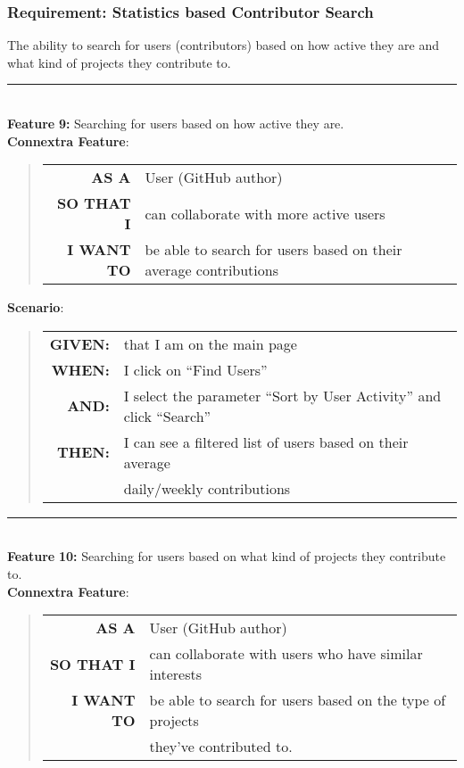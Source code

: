 \documentclass[12pt]{article}
\newcommand{\Feature}[1]{ 
   \noindent \textbf{Feature} #1
}
\newcommand{\GivenSc} {
	\noindent \textbf{GIVEN:}
	}
\newcommand{\WhenSc} {
	\noindent \textbf{WHEN:}
	}
\newcommand{\AndSc} {
	\noindent \textbf{AND:}
	}
\newcommand{\ThenSc} {
	\noindent \textbf{THEN:}
	}
\begin{document}
\pagebreak
\begin{framed}
\subsubsection{Requirement: Statistics based Contributor Search}
The ability to search for users (contributors) based on how active they are and what kind of projects they contribute to.\\[0.2cm]

\hrule~\\

\noindent \Feature{\textbf{9:} Searching for users based on how active they are.}\\[0.2cm]

\noindent \textbf{Connextra Feature}:
\begin{quote}
\begin{tabular}{rl}
\textbf{AS A}      & User (\textsf{GitHub} author)\\
\textbf{SO THAT I} & can collaborate with more active users\\
\textbf{I WANT TO} & be able to search for users based on their average contributions
\end{tabular}
\end{quote}

\noindent \textbf{Scenario}:
\begin{quote}
\begin{tabular}{rl}
\GivenSc & that I am on the main page\\
\WhenSc  & I click on ``Find Users''\\
\AndSc   & I select the parameter ``Sort by User Activity'' and click ``Search''\\
\ThenSc  & I can see a filtered list of users based on their average \\ 
         & daily/weekly contributions 
\end{tabular}
\end{quote}

\hrule~\\

\noindent \Feature{\textbf{10:} Searching for users based on what kind of projects they contribute to.}\\[0.2cm]

\noindent \textbf{Connextra Feature}:
\begin{quote}
\begin{tabular}{rl}
\textbf{AS A}      & User (\textsf{GitHub} author)\\
\textbf{SO THAT I} & can collaborate with users who have similar interests\\
\textbf{I WANT TO} & be able to search for users based on the type of projects \\
                   & they've contributed to.
\end{tabular}
\end{quote}


\end{framed}
\end{document}
